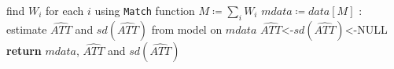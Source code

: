 \documentclass{report}
\newcommand{\code}[1]{\texttt{#1}}
\begin{document}
\nopagecolor
\begin{algorithm}
\begin{algorithmic}[H]
\State find $W_i$ for each $i$ using \code{Match} function
\State $M \coloneqq \sum_i W_i$ %
\State $mdata\coloneqq data[M]$ 
:
\State estimate $\widehat{ATT}$ and $sd(\widehat{ATT})$ from model on $mdata$
\Else
\State $\widehat{ATT}$<-$sd(\widehat{ATT})$<-NULL
\EndIf
\State \textbf{return} $mdata$, $\widehat{ATT}$ and $sd(\widehat{ATT})$ %
\EndProcedure
\end{algorithmic}
\end{algorithm}
\end{document}
